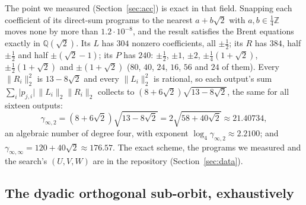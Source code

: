 \documentclass[11pt]{article}
\theoremstyle{remark}
\newcommand{\Q}{\mathbb{Q}}
\newcommand{\Z}{\mathbb{Z}}
\newcommand{\ginf}{\gamma_{\infty,2}}
\newcommand{\giinf}{\gamma_{\infty,\infty}}
\begin{document}
The point we measured (Section~\ref{sec:acc}) is exact in that field.
Snapping each coefficient of its direct-sum programs to the nearest
$a+b\sqrt2$ with $a,b\in\frac14\Z$ moves none by more than
$1.2\cdot10^{-8}$, and the result satisfies the Brent equations exactly
in $\Q(\sqrt2)$.  Its $L$ has $304$ nonzero coefficients, all
$\pm\frac12$; its $R$ has $384$, half $\pm\frac12$ and half
$\pm(\sqrt2-1)$; its $P$ has $240$: $\pm\frac12$, $\pm1$, $\pm2$,
$\pm\frac14(1+\sqrt2)$, $\pm\frac12(1+\sqrt2)$ and $\pm(1+\sqrt2)$
($80$, $40$, $24$, $16$, $56$ and $24$ of them).  Every
$\lVert R_i\rVert_2^2$ is $13-8\sqrt2$ and every $\lVert L_i\rVert_2^2$
is rational, so each output's sum
$\sum_i\lvert p_{j,i}\rvert\,\lVert L_i\rVert_2\lVert R_i\rVert_2$
collects to $(8+6\sqrt2)\sqrt{13-8\sqrt2}$, the same for all sixteen
outputs:
\begin{equation}\label{eq:g214}
\ginf=(8+6\sqrt2)\sqrt{13-8\sqrt2}=2\sqrt{58+40\sqrt2}\approx21.40734,
\end{equation}
an algebraic number of degree four, with exponent
$\log_4\ginf\approx2.2100$; and $\giinf=120+40\sqrt2\approx176.57$.
The exact scheme, the programs we measured and the search's $(U,V,W)$
are in the repository (Section~\ref{sec:data}).

\subsection{The dyadic orthogonal sub-orbit, exhaustively}\label{sec:dyadic}
\end{document}
